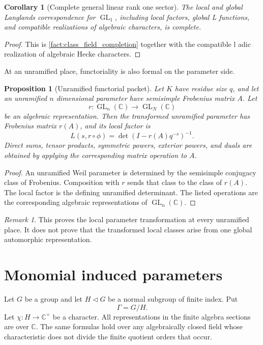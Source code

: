 \documentclass{aomart}
\newtheorem{proposition}[proposition]{Proposition}
\newtheorem{corollary}[corollary]{Corollary}
\theoremstyle{definition}
\theoremstyle{remark}
\newtheorem{remark}[remark]{Remark}
\newcommand{\CC}{\mathbb C}
\newcommand{\GL}{\operatorname{GL}}
\begin{document}
\begin{corollary}[Complete general linear rank one sector]\label{cor:gl1_complete}
The local and global Langlands correspondence for \(\GL_1\), including local factors, global L functions, and compatible realizations of algebraic characters, is complete.
\end{corollary}

\begin{proof}
This is \cref{fact:class_field_completion} together with the compatible l adic realization of algebraic Hecke characters.
\end{proof}

At an unramified place, functoriality is also formal on the parameter side.

\begin{proposition}[Unramified functorial packet]\label{prop:unramified_functoriality}
Let \(K\) have residue size \(q\), and let an unramified \(n\) dimensional parameter have semisimple Frobenius matrix \(A\). Let
\[
r:\GL_n(\CC)\longrightarrow\GL_N(\CC)
\]
be an algebraic representation. Then the transformed unramified parameter has Frobenius matrix \(r(A)\), and its local factor is
\[
\boxed{
L(s,r\circ\phi)
=
\det
\left(
I-r(A)q^{-s}
\right)^{-1}.
}
\]
Direct sums, tensor products, symmetric powers, exterior powers, and duals are obtained by applying the corresponding matrix operation to \(A\).
\end{proposition}

\begin{proof}
An unramified Weil parameter is determined by the semisimple conjugacy class of Frobenius. Composition with \(r\) sends that class to the class of \(r(A)\). The local factor is the defining unramified determinant. The listed operations are the corresponding algebraic representations of \(\GL_n(\CC)\).
\end{proof}

\begin{remark}\label{rem:unramified_boundary}
This proves the local parameter transformation at every unramified place. It does not prove that the transformed local classes arise from one global automorphic representation.
\end{remark}

\section{Monomial induced parameters}\label{sec:monomial}

Let \(G\) be a group and let \(H\triangleleft G\) be a normal subgroup of finite index. Put
\[
\Gamma=G/H.
\]
Let \(\chi:H\to\CC^{\times}\) be a character. All representations in the finite algebra sections are over \(\CC\). The same formulas hold over any algebraically closed field whose characteristic does not divide the finite quotient orders that occur.
\end{document}
